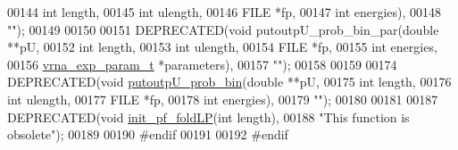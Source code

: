 \begin{DoxyCode}
00144                                  \textcolor{keywordtype}{int}    length,
00145                                  \textcolor{keywordtype}{int}    ulength,
00146                                  FILE   *fp,
00147                                  \textcolor{keywordtype}{int}    energies),
00148 \textcolor{stringliteral}{""});
00149 
00150 
00151 DEPRECATED(\textcolor{keywordtype}{void} putoutpU\_prob\_bin\_par(\textcolor{keywordtype}{double}            **pU,
00152                                       \textcolor{keywordtype}{int}               length,
00153                                       \textcolor{keywordtype}{int}               ulength,
00154                                       FILE              *fp,
00155                                       \textcolor{keywordtype}{int}               energies,
00156                                       \hyperlink{group__energy__parameters_structvrna__exp__param__s}{vrna\_exp\_param\_t}  *parameters),
00157 \textcolor{stringliteral}{""});
00158 
00159 
00174 DEPRECATED(\textcolor{keywordtype}{void}    \hyperlink{group__part__func__window__deprecated_ga9acb00ee10e96b1ca4ea394cd8bcec75}{putoutpU\_prob\_bin}(\textcolor{keywordtype}{double} **pU,
00175                                      \textcolor{keywordtype}{int}    length,
00176                                      \textcolor{keywordtype}{int}    ulength,
00177                                      FILE   *fp,
00178                                      \textcolor{keywordtype}{int}    energies),
00179 \textcolor{stringliteral}{""});
00180 
00181 
00187 DEPRECATED(\textcolor{keywordtype}{void} \hyperlink{LPfold_8h_ae85bf55053e9fb295208be322e0fa07a}{init\_pf\_foldLP}(\textcolor{keywordtype}{int} length),
00188 \textcolor{stringliteral}{"This function is obsolete"});
00189 
00190 \textcolor{preprocessor}{#endif}
00191 
00192 \textcolor{preprocessor}{#endif}
\end{DoxyCode}
